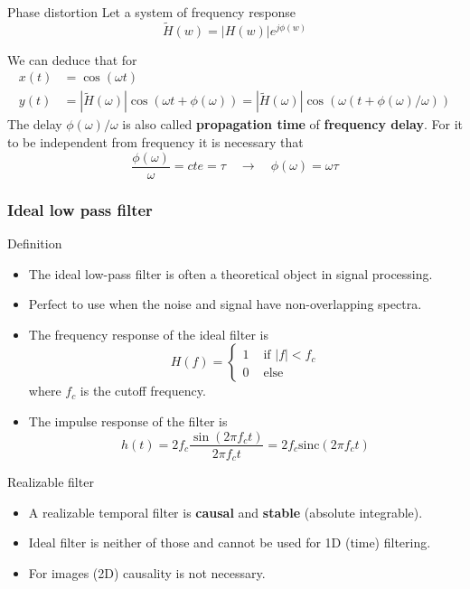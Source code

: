   \begin{block}{Phase distortion}
    Let a system of frequency response 
    $$\tilde H(w)=|H(w)|e^{j\phi(w)}$$

  We can deduce that for 
\begin{align*}
x(t)&=\cos(\omega t)\\
y(t)&=|\tilde H(\omega)| \cos(\omega t+ \phi(\omega))=|\tilde H(\omega)| \cos(\omega (t+ \phi(\omega)/\omega))
\end{align*}
The delay $\phi(\omega)/\omega$ is also called  \textbf{propagation time} of \textbf{frequency delay}.  For it to be independent from frequency it is necessary that
\begin{displaymath}
\frac{\phi(\omega)}{\omega}=cte=\tau\quad \rightarrow \quad \phi(\omega)=\omega\tau
\end{displaymath}
  \end{block}

  \frametitle{Ideal low pass filter}

  \begin{block}{Definition}
    \begin{itemize}
    \item The ideal low-pass filter is often a theoretical object in signal processing.
    \item Perfect to use when the noise and signal have non-overlapping spectra.
    \item The frequency response of the ideal filter is 
$$
H(f)= \left \{ 
\begin{array}{ll}
1 & \text{ if } |f| < f_c \\
0 & \text{ else} 
\end{array}
\right.
$$
where $f_c$ is the cutoff frequency.
\item The impulse response of the filter is %
\begin{equation*}
  h(t)={2f_c\frac{\sin(2\pi f_c t)}{2\pi f_ct}=2f_c\text{sinc}(2\pi f_ct)}
\end{equation*}
    \end{itemize}
  \end{block}
\vspace{-5mm}
  \begin{block}{Realizable filter}
    \begin{itemize}
    \item A realizable temporal filter is \textbf{causal} and \textbf{stable} (absolute integrable).
    \item Ideal filter is neither of those and cannot be used for 1D (time) filtering.
    \item For images (2D) causality is not necessary.
    \end{itemize}
  \end{block}


